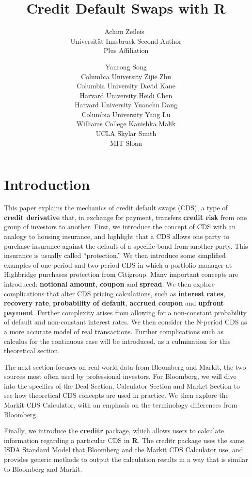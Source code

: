 \documentclass{jss}
\author{Achim Zeileis~\orcidlink{0000-0003-0918-3766}\\Universit\"at Innsbruck
   \And Second Author\\Plus Affiliation}
\author{
  Yanrong Song\\Columbia University \And 
  Zijie Zhu\\Columbia University \And
  David Kane\\Harvard University \And
  Heidi Chen\\Harvard University \AND
  Yuanchu Dang\\Columbia University \And
  Yang Lu\\Williams College \And
  Kanishka Malik\\UCLA \And
  Skylar Smith\\MIT Sloan
}
\title{Credit Default Swaps with R}
\begin{document}
\section{Introduction}


This paper explains the mechanics of credit default swaps (CDS), a type of \textbf{credit derivative} that, in exchange for payment, transfers \textbf{credit risk} from one group of investors to another. First, we introduce the concept of CDS with an analogy to housing insurance, and highlight that a CDS allows one party to purchase insurance against the default of a specific bond from another party. This insurance is usually called ``protection.'' We then introduce some simplified examples of one-period and two-period CDS in which a portfolio manager at Highbridge purchases protection from Citigroup. Many important concepts are introduced: \textbf{notional amount}, \textbf{coupon} and \textbf{spread}. We then explore complications that alter CDS pricing calculations, such as \textbf{interest rates}, \textbf{recovery rate}, \textbf{probability of default}, \textbf{accrued coupon} and \textbf{upfront payment}. Further complexity arises from allowing for a non-constant probability of default and non-constant interest rates. We then consider the N-period CDS as a more accurate model of real transactions. Further complications such as calculus for the continuous case will be introduced, as a culmination for this theoretical section.
  
The next section focuses on real world data from Bloomberg and Markit, the two sources most often used by professional investors. For Bloomberg, we will dive into the specifics of the Deal Section, Calculator Section and Market Section to see how theoretical CDS concepts are used in practice. We then explore the Markit CDS Calculator, with an emphasis on the terminology differences from Bloomberg.

Finally, we introduce the \textbf{creditr} package, which allows users to calculate information regarding a particular CDS in \textbf{R}. The creditr package uses the same ISDA Standard Model that Bloomberg and the Markit CDS Calculator use, and provides generic methods to output the calculation results in a way that is similar to Bloomberg and Markit.
\end{document}
